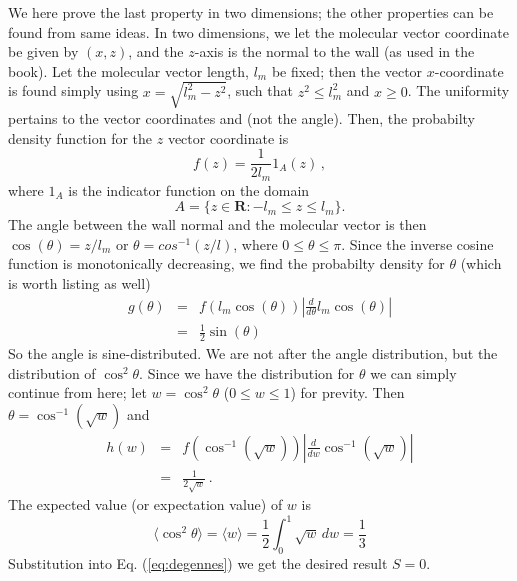 \documentclass[11pt]{article}
\begin{document}
\noindent We here prove the last property in two dimensions; the other properties can be found from same ideas. 
In two dimensions, we let the molecular vector coordinate be given by $(x,z)$, and the $z$-axis is the normal to the wall 
(as used in the book). Let the molecular vector length, $l_m$ be fixed; then the vector $x$-coordinate is found
simply using $x = \sqrt{l_m^2 - z^2}$, such that $z^2 \leq l_m^2$ and $x \geq 0$. The uniformity pertains to the vector coordinates
and (not the angle). Then, the probabilty density function for the $z$ vector coordinate is
\begin{equation}
	f(z) = \frac{1}{2l_m} 1_A(z) \,  ,
\end{equation}
where $1_A$ is the indicator function on the domain 
\[
	A=\{z\in \mathbf{R} : -l_m \leq z \leq l_m\}. 
\]
The angle between the wall normal and the 
molecular vector is then $\cos(\theta)=z/l_m$ or $\theta = cos^{-1}(z/l)$, where $0 \leq \theta \leq \pi$. Since the 
inverse cosine function is monotonically decreasing, we find the probabilty density for $\theta$ (which is worth listing 
as well)
\begin{eqnarray}
 	g(\theta) &=& f ( l_m \cos(\theta) ) \left| \frac{d}{d\theta} l_m \cos(\theta) \right| \nonumber \\
		&=& \frac{1}{2} \sin(\theta)
\end{eqnarray}
So the angle is sine-distributed. We are not after the angle distribution, but the distribution of $\cos^2 \theta$. Since
we have the distribution for $\theta$ we can simply continue from here; let $w=\cos^2\theta$ ($ 0\leq w \leq 1$) for previty. 
Then $\theta = \cos^{-1}(\sqrt{w})$ and
\begin{eqnarray}
	h(w) &=& f\left(\cos^{-1}(\sqrt{w})\right)\left| \frac{d}{dw} \cos^{-1}(\sqrt{w}) \right| \nonumber \\
	&=& \frac{1}{2 \sqrt{w}}\, .
\end{eqnarray}
The expected value (or expectation value) of $w$ is
\begin{equation}
\langle \cos^2 \theta \rangle = \langle w \rangle = \frac{1}{2}\int_0^1 \sqrt{w} \, dw = \frac{1}{3} 
\end{equation}
Substitution into Eq. (\ref{eq:degennes}) we get the desired result $S=0$.
\end{document}
